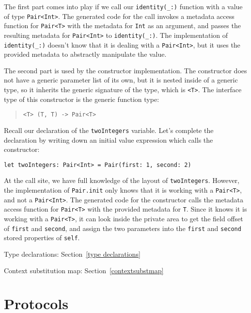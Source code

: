 \documentclass[a4paper,headsepline,bibliography=totoc,toc=flat,fleqn,twoside=semi]{scrbook}
\theoremstyle{definition}
\theoremstyle{definition}
\theoremstyle{definition}
\begin{document}
The first part comes into play if we call our \verb|identity(_:)| function with a value of type \texttt{Pair<Int>}. The generated code for the call invokes a metadata access function for \texttt{Pair<T>} with the metadata for \texttt{Int} as an argument, and passes the resulting metadata for \texttt{Pair<Int>} to \verb|identity(_:)|. The implementation of \verb|identity(_:)| doesn't know that it is dealing with a \texttt{Pair<Int>}, but it uses the provided metadata to abstractly manipulate the value.

The second part is used by the constructor implementation. The constructor does not have a generic parameter list of its own, but it is nested inside of a generic type, so it inherits the generic signature of the type, which is \texttt{<T>}. The interface type of this constructor is the generic function type:
\begin{quote}
\begin{verbatim}
<T> (T, T) -> Pair<T>
\end{verbatim}
\end{quote}
Recall our declaration of the \texttt{twoIntegers} variable. Let's complete the declaration by writing down an initial value expression which calls the constructor:
\begin{Verbatim}
let twoIntegers: Pair<Int> = Pair(first: 1, second: 2)
\end{Verbatim}
At the call site, we have full knowledge of the layout of \texttt{twoIntegers}. However, the implementation of \texttt{Pair.init} only knows that it is working with a \texttt{Pair<T>}, and not a \texttt{Pair<Int>}. The generated code for the constructor calls the metadata access function for \texttt{Pair<T>} with the provided metadata for \texttt{T}. Since it knows it is working with a \texttt{Pair<T>}, it can look inside the private area to get the field offset of \texttt{first} and \texttt{second}, and assign the two parameters into the \texttt{first} and \texttt{second} stored properties of \texttt{self}.

\begin{MoreDetails}
\item Type declarations: Section~\ref{type declarations}
\item Context substitution map: Section~\ref{contextsubstmap}
\end{MoreDetails}

\section{Protocols}
\end{document}
